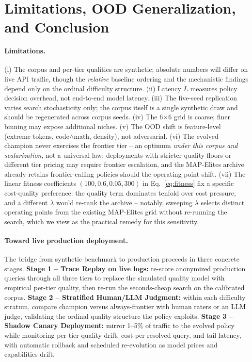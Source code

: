 \documentclass[11pt]{article}
\begin{document}
\section{Limitations, OOD Generalization, and Conclusion}
\paragraph{Limitations.} (i) The corpus and per-tier qualities are synthetic; absolute numbers will differ on live API traffic, though the \emph{relative} baseline ordering and the mechanistic findings depend only on the ordinal difficulty structure. (ii) Latency $L$ measures policy decision overhead, not end-to-end model latency. (iii) The five-seed replication varies search stochasticity only; the corpus itself is a single synthetic draw and should be regenerated across corpus seeds. (iv) The 6$\times$6 grid is coarse; finer binning may expose additional niches. (v) The OOD shift is feature-level (extreme tokens, code$\wedge$math, density), not adversarial. (vi) The evolved champion never exercises the frontier tier -- an optimum \emph{under this corpus and scalarization}, not a universal law: deployments with stricter quality floors or different tier pricing may require frontier escalation, and the MAP-Elites archive already retains frontier-calling policies should the operating point shift. (vii) The linear fitness coefficients $(100, 0.6, 0.05, 300)$ in Eq.~\eqref{eq:fitness} fix a specific cost-quality preference: the quality term dominates tenfold over cost pressure, and a different $\lambda$ would re-rank the archive -- notably, sweeping $\lambda$ selects distinct operating points from the existing MAP-Elites grid without re-running the search, which we view as the practical remedy for this sensitivity.
\paragraph{Toward live production deployment.} The bridge from synthetic benchmark to production proceeds in three concrete stages. \textbf{Stage 1 -- Trace Replay on live logs:} re-score anonymized production queries through all three tiers to replace the simulated quality model with empirical per-tier quality, then re-run the seconds-cheap search on the calibrated corpus. \textbf{Stage 2 -- Stratified Human/LLM Judgment:} within each difficulty stratum, compare champion versus always-frontier with human raters or an LLM judge, validating the ordinal quality structure the policy exploits. \textbf{Stage 3 -- Shadow Canary Deployment:} mirror 1--5\% of traffic to the evolved policy while monitoring per-tier quality drift, cost per resolved query, and tail latency, with automatic rollback and scheduled re-evolution as model prices and capabilities drift.
\end{document}
